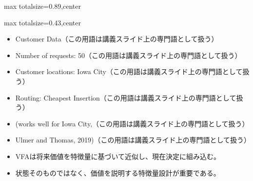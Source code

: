 \begin{minipage}[t]{0.58\textwidth}
\begin{adjustbox}{max totalsize={\textwidth}{0.89\textheight},center}
\begin{minipage}{\textwidth}
\end{minipage}
\end{adjustbox}
\end{minipage}


\clearpage
{}
\begin{minipage}[t]{0.405\textwidth}
\begin{adjustbox}{max totalsize={\textwidth}{0.43\textheight},center}
\begin{minipage}{\textwidth}\scriptsize
{}\begin{itemize}
\item Customer Data（この用語は講義スライド上の専門語として扱う）
\item Number of requests: 50（この用語は講義スライド上の専門語として扱う）
\item Customer locations: Iowa City（この用語は講義スライド上の専門語として扱う）
\item Routing: Cheapest Insertion（この用語は講義スライド上の専門語として扱う）
\item (works well for Iowa City,（この用語は講義スライド上の専門語として扱う）
\item Ulmer and Thomas, 2019)（この用語は講義スライド上の専門語として扱う）
\end{itemize}\begin{itemize}
\item VFAは将来価値を特徴量に基づいて近似し、現在決定に組み込む。
\item 状態そのものではなく、価値を説明する特徴量設計が重要である。
\end{itemize}
\end{minipage}
\end{adjustbox}
\end{minipage}\hfill
